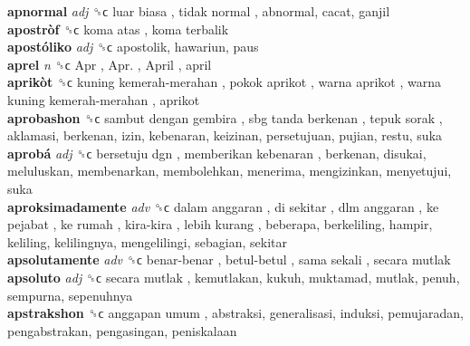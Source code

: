 \textbf{apnormal} \emph{adj}  ␝ϲ   luar biasa ,  tidak normal , abnormal, cacat, ganjil  \\
\textbf{apostròf} ␝ϲ   koma atas ,  koma terbalik   \\
\textbf{apostóliko} \emph{adj}  ␝ϲ  apostolik, hawariun, paus  \\
\textbf{aprel} \emph{n}  ␝ϲ   Apr ,  Apr. ,  April , april  \\
\textbf{aprikòt} ␝ϲ   kuning kemerah-merahan ,  pokok aprikot ,  warna aprikot ,  warna kuning kemerah-merahan , aprikot  \\
\textbf{aprobashon} ␝ϲ   sambut dengan gembira ,  sbg tanda berkenan ,  tepuk sorak , aklamasi, berkenan, izin, kebenaran, keizinan, persetujuan, pujian, restu, suka  \\
\textbf{aprobá} \emph{adj}  ␝ϲ   bersetuju dgn ,  memberikan kebenaran , berkenan, disukai, meluluskan, membenarkan, membolehkan, menerima, mengizinkan, menyetujui, suka  \\
\textbf{aproksimadamente} \emph{adv}  ␝ϲ   dalam anggaran ,  di sekitar ,  dlm anggaran ,  ke pejabat ,  ke rumah ,  kira-kira ,  lebih kurang , beberapa, berkeliling, hampir, keliling, kelilingnya, mengelilingi, sebagian, sekitar  \\
\textbf{apsolutamente} \emph{adv}  ␝ϲ   benar-benar ,  betul-betul ,  sama sekali ,  secara mutlak   \\
\textbf{apsoluto} \emph{adj}  ␝ϲ   secara mutlak , kemutlakan, kukuh, muktamad, mutlak, penuh, sempurna, sepenuhnya  \\
\textbf{apstrakshon} ␝ϲ   anggapan umum , abstraksi, generalisasi, induksi, pemujaradan, pengabstrakan, pengasingan, peniskalaan  \\
